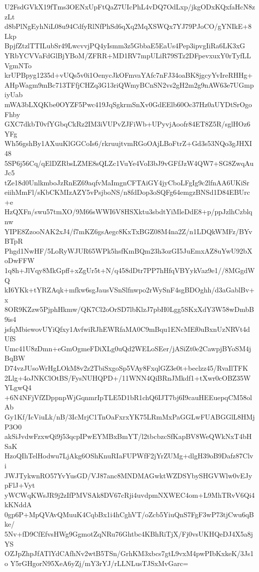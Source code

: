 U2FsdGVkX19fTms3OENxUpFtQaZ7UIcPhL4vDQ7OdLxp/jkgODxKQxfaHcN8zzLt
d8bPlNgEyhNiL08u94CdfyRlNfPhSd6qXq2MqXSWQx7YJ79PJoCO/gYNIkE+8Lkp
BpjfZtzlTTILubSr49LwcvvjPQ4yIsmm3z5GbbaE5EaUs4Pep3ipvgIiRa6LK3xG
YRbYCVVaFdGlBjYBoM/ZFRR+MD1RV7mpULiR79STz2DFpevxuxY0rTyfLLVgmNTo
krUPBpyg1235d+vUQs5v0i1OenycJkOFmvaYAfc7nFJ34oaBK8jgcyYvIreRHHg+
AHpWagm9mBc713TFfjCHZq3G13riQWmyBCnSN2vs2gH2m2g9nAW63e7UGmpiyUab
mWA3bLXQKbe0OYZF5Pwc419JqSgkrmSnXv0GdEElb60Oc37Hz0aUYDtSrOgoFhby
GXC7dkbT0vfYGbqCkRz2IM3iVUPvZJFiWb+UPyvjAoofr84ET8Z5R/sglHOz6YFg
Wh56gshBy1AXuuKlGGCoIs6/rkruujtvmRGoOAjLBoFtrZ+Gd3s53NQo3gJHXI48
5SP6j56Cq/qElDZRbsLZME8sQLZc1VuYe4VoI3bJ9vGFfJzW4QW7+SG8ZwqAuJc5
tZe18d0UnlkmboJzRnEZ69aqfvMaImgnCFTAiGY4jyCboLFgIg9c2lfnAA6UKiSr
eiihMmFl/sKbCKMIzAZY5vPsjboNS/n8fdDop3oSQFg64emgzBNSd1D84EBUrc+e
HzQXFn/swu57tmXO/9M66sWWI6V8HSXktu3sbdtYiMleDdE8+p/ppJzlhCzblqnw
YIPE8ZzooNAK2xJ4/f7mKZ6gsAegc8KxTxBGZ08M4na2Z/n1LDQkWMFz/BYvBTpR
Phgd1NwHF/5LoRyWJUR65WPk5hsfKmBQm23h3ozGI5JuEmxAZ8uYwU92bXoDwFFW
1q8h+JlVqy8MkGpff+xZgUr5t+N/q458dDtr7PP7hHfqVBYykVaz9e1//8MGgdWQ
kI6YKk+tYRZAqk+mfkw6sgJausVSnSlfnwpo2rWySnF4sgBDOghh/d3aGablBv+x
8OR9KZzw5PjphHkmw/QK7Cl2oOrSD7lbKlzJ7pbH0Lgg5SKxXdY3W58wDmbB9is4
jsfqMbiewovUYiQfxy1AvfwiRJhEWRfaMA0C9mBqu1ENcMEf0uBxnUzNRVt4dUfS
Umc41U8zDmn+eGmOgmeFDiXLg0uQd2WELoSEer/jASiZt0e2CawpjBYoSM4jBqBW
D74vzJUsoWrHgLOkM8v2z2TbiSxgoSp5VAy8FxqlGZ3e0t+beclzz45/RvaIlTFK
2Llg+4oJNKClOtBS/FysNUHQPD+/11WNN4QiBRnJMkdf1+tXwr0cOBZ35WYLgwQ4
+6N4NFjVfZDppnpWjGqnmrIpTLE5D1bR1chQ6IJT7bj6I9cauHEEuepqCM58olAb
Gy1Kf/IcViuLk/nB/3IcMrjC1TnOaFxrxYK75LRmMxPaGGLwFUABGGlL8HMjP3O0
akSiJvdwFzxwQi9j53qcpIPwEYMBxBmYT/l2tbcbzcSfKapBV8WeQWkNxT4bHSaK
HzoQIhTelHodwu7LjAkg6OShKnuRIaFUPWfF2jYrZUMg+dlgH39oB9Dafz87Clvi
JWJTykwnRO57YvYusGD/VJ87anc8MNDMAGwktWZDSYbySHGVWlw0vEJypFlJ+Vyt
yWCWqKWsJR9j2zIfPMVSAk8DV67cRji4uvdpmNXWEC4om+L9MhTRvV6Qi4kKNddA
0gp6P+MpQVAvQMuuK4CqbBx1i4hCghVT/oZcb5YiuQnS7FgF3wP73tjCwu6qBke/
5Nv+fD9CfEfvsHWg9GgmotZqNRu76Ghtbc4KBhRiTjX/Fj0vsUKHQeDJ4X5a8jYS
OZJpZhpJfATlYdCAfhNv2wtB5TSn/GrhKM3xbcs7gtL9vxM4pwPIbKxkeK/3Js1o
Y5rGHgorN95XeA6yZj/mY3rYJ/rLLNLusTJSxMvGarc=

